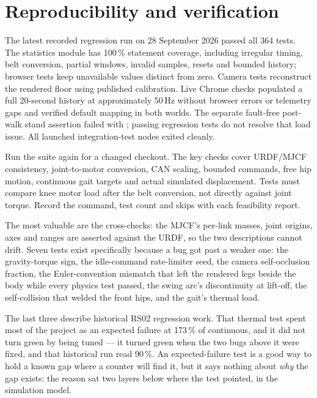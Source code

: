 \documentclass[11pt,a4paper]{article}
\begin{document}
\section{Reproducibility and verification}

The latest recorded regression run on 28 September 2026 passed all 364 tests.
The statistics module has 100\,\% statement coverage, including irregular
timing, belt conversion, partial windows, invalid samples, resets and bounded
history; browser tests keep unavailable values distinct from zero. Camera
tests reconstruct the rendered floor using published calibration. Live Chrome
checks populated a full 20-second history at approximately 50\,Hz without
browser errors or telemetry gaps and verified default mapping in both worlds.
The separate fault-free post-walk stand assertion failed with
; passing regression tests do not resolve that load issue.
All launched integration-test nodes exited cleanly.

Run the suite again for a changed checkout. The key checks cover URDF/MJCF
consistency, joint-to-motor conversion, CAN scaling, bounded commands, free hip
motion, continuous gait targets and actual simulated displacement. Tests must
compare knee motor load after the belt conversion, not directly against joint
torque. Record the command, test count and skips with each feasibility report.

The most valuable are the cross-checks: the MJCF's per-link masses, joint
origins, axes and ranges are asserted against the URDF, so the two descriptions
cannot drift. Seven tests exist specifically because a bug got past a weaker
one: the gravity-torque sign, the idle-command rate-limiter seed, the camera
self-occlusion fraction, the Euler-convention mismatch that left the rendered
legs beside the body while every physics test passed, the swing arc's
discontinuity at lift-off, the self-collision that welded the front hips, and
the gait's thermal load.

The last three describe historical RS02 regression work. That thermal test
spent most of the project as an expected failure at 173\,\% of continuous, and it did not turn
green by being tuned --- it turned green when the two bugs above it were
fixed, and that historical run read 90\,\%. An expected-failure test is a good way to hold
a known gap where a counter will find it, but it says nothing about
\emph{why} the gap exists: the reason sat two layers below where the test
pointed, in the simulation model.
\end{document}
